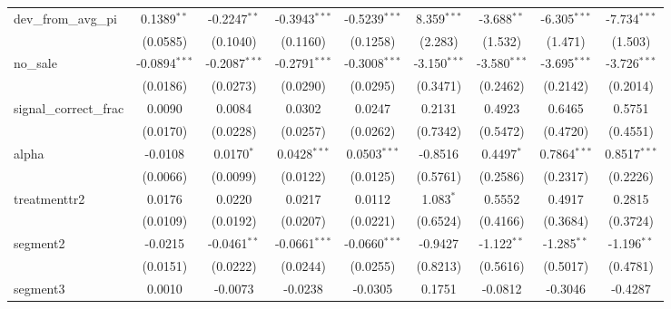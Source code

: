 \begin{tabular}{lcccccccc}
   dev\_from\_avg\_pi               & 0.1389$^{**}$   & -0.2247$^{**}$  & -0.3943$^{***}$ & -0.5239$^{***}$ & 8.359$^{***}$  & -3.688$^{**}$  & -6.305$^{***}$ & -7.734$^{***}$\\   
                                    & (0.0585)        & (0.1040)        & (0.1160)        & (0.1258)        & (2.283)        & (1.532)        & (1.471)        & (1.503)\\   
   no\_sale                         & -0.0894$^{***}$ & -0.2087$^{***}$ & -0.2791$^{***}$ & -0.3008$^{***}$ & -3.150$^{***}$ & -3.580$^{***}$ & -3.695$^{***}$ & -3.726$^{***}$\\   
                                    & (0.0186)        & (0.0273)        & (0.0290)        & (0.0295)        & (0.3471)       & (0.2462)       & (0.2142)       & (0.2014)\\   
   signal\_correct\_frac            & 0.0090          & 0.0084          & 0.0302          & 0.0247          & 0.2131         & 0.4923         & 0.6465         & 0.5751\\   
                                    & (0.0170)        & (0.0228)        & (0.0257)        & (0.0262)        & (0.7342)       & (0.5472)       & (0.4720)       & (0.4551)\\   
   alpha                            & -0.0108         & 0.0170$^{*}$    & 0.0428$^{***}$  & 0.0503$^{***}$  & -0.8516        & 0.4497$^{*}$   & 0.7864$^{***}$ & 0.8517$^{***}$\\   
                                    & (0.0066)        & (0.0099)        & (0.0122)        & (0.0125)        & (0.5761)       & (0.2586)       & (0.2317)       & (0.2226)\\   
   treatmenttr2                     & 0.0176          & 0.0220          & 0.0217          & 0.0112          & 1.083$^{*}$    & 0.5552         & 0.4917         & 0.2815\\   
                                    & (0.0109)        & (0.0192)        & (0.0207)        & (0.0221)        & (0.6524)       & (0.4166)       & (0.3684)       & (0.3724)\\   
   segment2                         & -0.0215         & -0.0461$^{**}$  & -0.0661$^{***}$ & -0.0660$^{***}$ & -0.9427        & -1.122$^{**}$  & -1.285$^{**}$  & -1.196$^{**}$\\   
                                    & (0.0151)        & (0.0222)        & (0.0244)        & (0.0255)        & (0.8213)       & (0.5616)       & (0.5017)       & (0.4781)\\   
   segment3                         & 0.0010          & -0.0073         & -0.0238         & -0.0305         & 0.1751         & -0.0812        & -0.3046        & -0.4287\\   

\end{tabular}
